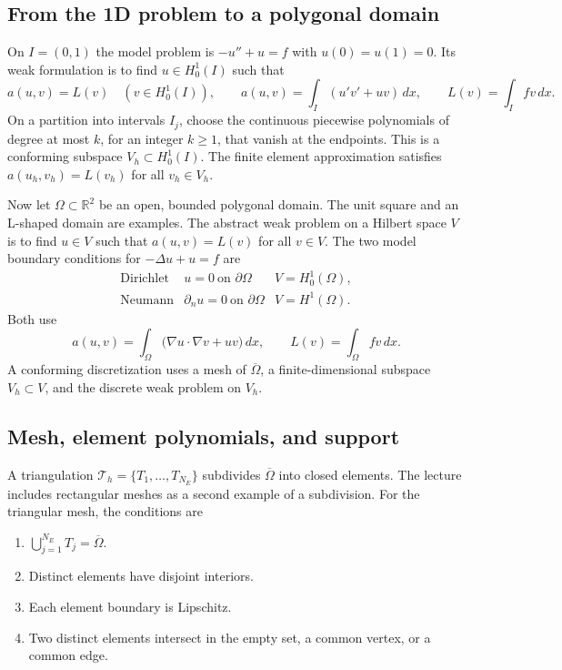 \documentclass[11pt,a4paper]{article}
\begin{document}
\subsection{From the 1D problem to a polygonal domain}

On \(I=(0,1)\) the model problem is \(-u''+u=f\) with \(u(0)=u(1)=0\).
Its weak formulation is to find \(u\in H_0^1(I)\) such that
\[
 a(u,v)=L(v)\quad(v\in H_0^1(I)),\qquad
 a(u,v)=\int_I (u'v'+uv)\,dx,\qquad L(v)=\int_I fv\,dx.
\]
On a partition into intervals \(I_j\), choose the continuous piecewise
polynomials of degree at most \(k\), for an integer \(k\geq 1\), that vanish
at the endpoints. This is a conforming subspace \(V_h\subset H_0^1(I)\).
The finite element approximation satisfies \(a(u_h,v_h)=L(v_h)\) for all
\(v_h\in V_h\).

Now let \(\Omega\subset\mathbb R^2\) be an open, bounded polygonal domain.
The unit square and an L-shaped domain are examples. The abstract weak
problem on a Hilbert space \(V\) is to find \(u\in V\) such that
\(a(u,v)=L(v)\) for all \(v\in V\). The two model boundary conditions for
\(-\Delta u+u=f\) are
\[
\begin{array}{ccl}
\text{Dirichlet} & u=0\ \text{on }\partial\Omega & V=H_0^1(\Omega),\\
\text{Neumann} & \partial_n u=0\ \text{on }\partial\Omega & V=H^1(\Omega).
\end{array}
\]
Both use
\[
 a(u,v)=\int_\Omega \bigl(\nabla u\cdot\nabla v+uv\bigr)\,dx,
 \qquad L(v)=\int_\Omega fv\,dx.
\]
A conforming discretization uses a mesh of \(\overline\Omega\), a
finite-dimensional subspace \(V_h\subset V\), and the discrete weak problem
on \(V_h\).

\subsection{Mesh, element polynomials, and support}

A triangulation \(\mathcal T_h=\{T_1,\ldots,T_{N_E}\}\) subdivides
\(\overline\Omega\) into closed elements. The lecture includes rectangular
meshes as a second example of a subdivision. For the triangular mesh, the
conditions are
\begin{enumerate}
\item \(\bigcup_{j=1}^{N_E}T_j=\overline\Omega\).
\item Distinct elements have disjoint interiors.
\item Each element boundary is Lipschitz.
\item Two distinct elements intersect in the empty set, a common vertex,
or a common edge.
\end{enumerate}
\end{document}
